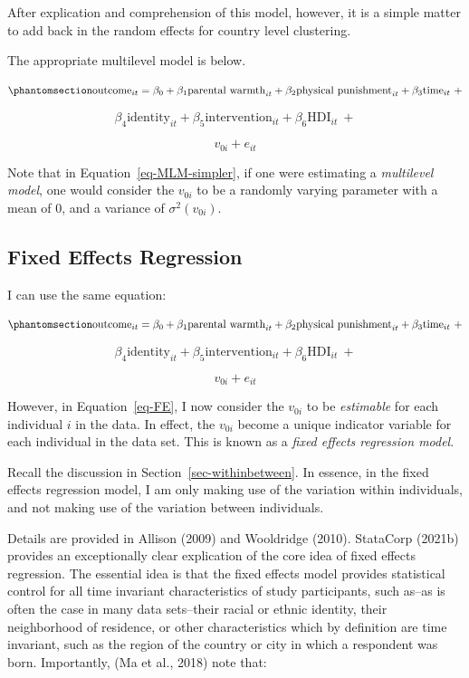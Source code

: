 \documentclass[
  letterpaper,
  DIV=11,
  numbers=noendperiod]{scrreprt}
\begin{document}
After explication and comprehension of this model, however, it is a
simple matter to add back in the random effects for country level
clustering.

The appropriate multilevel model is below.

\begin{equation}\phantomsection\label{eq-MLM-simpler}{\text{outcome}_{it} = \beta_0 + \beta_1 \text{parental warmth}_{it} + \beta_2 \text{physical punishment}_{it} + \beta_3 \text{time}_{it} \ + }\end{equation}

\[\beta_4 \text{identity}_{it} + \beta_5 \text{intervention}_{it} + \beta_6 \text{HDI}_{it} \ +\]

\[v_{0i} + e_{it}\]

Note that in Equation~\ref{eq-MLM-simpler}, if one were estimating a
\emph{multilevel model}, one would consider the \(v_{0i}\) to be a
randomly varying parameter with a mean of 0, and a variance of
\(\sigma^2(v_{0i})\).

\subsection{Fixed Effects Regression}\label{fixed-effects-regression}

I can use the same equation:

\begin{equation}\phantomsection\label{eq-FE}{\text{outcome}_{it} = \beta_0 + \beta_1 \text{parental warmth}_{it} + \beta_2 \text{physical punishment}_{it} + \beta_3 \text{time}_{it} \ + }\end{equation}

\[\beta_4 \text{identity}_{it} + \beta_5 \text{intervention}_{it} + \beta_6 \text{HDI}_{it} \ +\]

\[v_{0i} + e_{it}\]

However, in Equation~\ref{eq-FE}, I now consider the \(v_{0i}\) to be
\emph{estimable} for each individual \(i\) in the data. In effect, the
\(v_{0i}\) become a unique indicator variable for each individual in the
data set. This is known as a \emph{fixed effects regression model}.

Recall the discussion in Section~\ref{sec-withinbetween}. In essence, in
the fixed effects regression model, I am only making use of the
variation within individuals, and not making use of the variation
between individuals.

Details are provided in Allison (2009) and Wooldridge (2010). StataCorp
(2021b) provides an exceptionally clear explication of the core idea of
fixed effects regression. The essential idea is that the fixed effects
model provides statistical control for all time invariant
characteristics of study participants, such as--as is often the case in
many data sets--their racial or ethnic identity, their neighborhood of
residence, or other characteristics which by definition are time
invariant, such as the region of the country or city in which a
respondent was born. Importantly, (Ma et al., 2018) note that:
\end{document}
